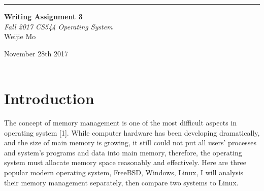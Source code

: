 \documentclass[10pt,draftclsnofoot,peerreview,letterpaper,onecolumn,]{IEEEtran}
\begin{document}
\begin{titlepage} %
	
	\raggedleft %
	
	\rule{1pt}{\textheight} %
	\hspace{0.05\textwidth} %
	\parbox[b]{0.75\textwidth}{ %
		
		{\Huge\bfseries Writing Assignment 3 }\\[2\baselineskip] %
		{\large\textit{Fall 2017 CS544 Operating System}}\\[4\baselineskip] %
		{\Large Weijie Mo} %
		
		\vspace{0.5\textheight} %
		
		{\noindent November 28th 2017}\\[\baselineskip] %
        {\noindent }\\[\baselineskip] %
	}

\end{titlepage}

\section{Introduction}
The concept of memory management is one of the most difficult aspects in operating system [1]. While computer hardware has been developing dramatically, and the size of main memory is growing, it still could not put all users’ processes and system’s programs and data into main memory, therefore, the operating system must allocate memory space reasonably and effectively. Here are three popular modern operating system, FreeBSD, Windows, Linux, I will analysis their memory management separately, then compare two systems to Linux.
\end{document}
